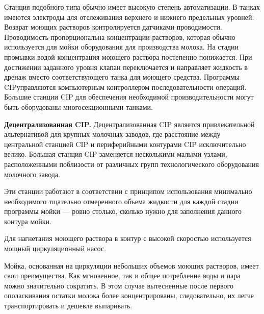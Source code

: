 {\par \redline Станция подобного типа обычно имеет высокую степень автоматизации. В танках имеются электроды для отслеживания верхнего и нижнего предельных уровней. Возврат моющих растворов контролируется датчиками проводимости. Проводимость пропорциональна концентрации растворов, которая обычно используется для мойки оборудования для производства молока. На стадии промывки водой концентрация моющего раствора постепенно понижается. При достижении заданного уровня клапан переключается и направляет жидкость в дренаж вместо соответствующего танка для моющего средства. Программы CIPуправляются компьютерным контроллером последовательности операций. Большие станции CIP для обеспечения необходимой производительности могут быть оборудованы многосекционными танками.

\par \redline \textbf{Децентрализованная CIP.} Децентрализованная CIP является привлекательной альтернативой для крупных молочных заводов, где расстояние между центральной станцией CIP и периферийными контурами CIP исключительно велико. Большая станция CIP заменяется несколькими малыми узлами, расположенными поблизости от различных групп технологического оборудования молочного завода.

\par \redline Эти станции работают в соответствии с принципом использования минимально необходимого тщательно отмеренного объема жидкости для каждой стадии программы мойки — ровно столько, сколько нужно для заполнения данного контура мойки.

\par \redline Для нагнетания моющего раствора в контур с высокой скоростью используется мощный циркуляционный насос.

\par \redline Мойка, основанная на циркуляции небольших объемов моющих растворов, имеет свои преимущества. Как мгновенное, так и общее потребление воды и пара можно значительно сократить. В этом случае вытесненные после первого ополаскивания остатки молока более концентрированы, следовательно, их легче транспортировать и дешевле выпаривать. 

}
